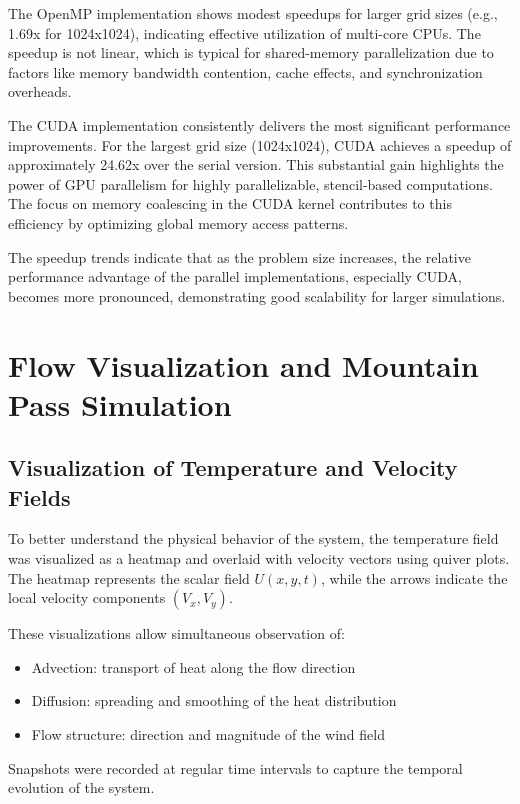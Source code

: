\documentclass[conference]{IEEEtran}
\begin{document}
The OpenMP implementation shows modest speedups for larger grid sizes (e.g., 1.69x for 1024x1024), indicating effective utilization of multi-core CPUs. The speedup is not linear, which is typical for shared-memory parallelization due to factors like memory bandwidth contention, cache effects, and synchronization overheads.

The CUDA implementation consistently delivers the most significant performance improvements. For the largest grid size (1024x1024), CUDA achieves a speedup of approximately 24.62x over the serial version. This substantial gain highlights the power of GPU parallelism for highly parallelizable, stencil-based computations. The focus on memory coalescing in the CUDA kernel contributes to this efficiency by optimizing global memory access patterns.

The speedup trends indicate that as the problem size increases, the relative performance advantage of the parallel implementations, especially CUDA, becomes more pronounced, demonstrating good scalability for larger simulations.

\section{Flow Visualization and Mountain Pass Simulation}

\subsection{Visualization of Temperature and Velocity Fields}

To better understand the physical behavior of the system, the temperature field was visualized as a heatmap and overlaid with velocity vectors using quiver plots. The heatmap represents the scalar field \(U(x,y,t)\), while the arrows indicate the local velocity components \((V_x, V_y)\).

These visualizations allow simultaneous observation of:
\begin{itemize}
    \item Advection: transport of heat along the flow direction
    \item Diffusion: spreading and smoothing of the heat distribution
    \item Flow structure: direction and magnitude of the wind field
\end{itemize}

Snapshots were recorded at regular time intervals to capture the temporal evolution of the system.
\end{document}
